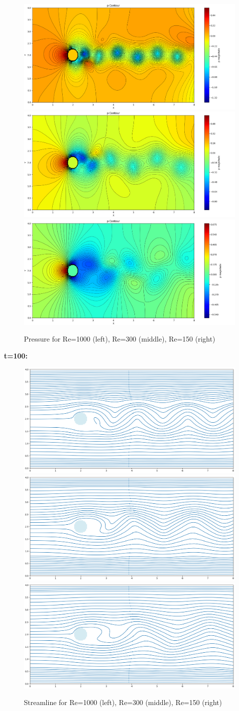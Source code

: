 \documentclass[12pt]{article}
\begin{document}
\begin{figure}[H]
    \centering
    \includegraphics[width=0.3\linewidth]{figure/N32_Re1000_8x4_t50/p_N32_Re1000_8x4_t50.jpg}
    \includegraphics[width=0.3\linewidth]{figure/N32_Re300_8x4_t50/p_N32_Re300_8x4_t50.jpg}
    \includegraphics[width=0.3\linewidth]{figure/N32_Re150_8x4_t50/p_N32_Re150_8x4_t50.jpg}
    \caption{Pressure for Re=1000 (left), Re=300 (middle), Re=150 (right)}
\end{figure}



\noindent \textbf{t=100:}
\begin{figure}[H]
    \centering
    \includegraphics[width=0.3\linewidth]{figure/N32_Re1000_8x4_t100/stline_N32_Re1000_8x4_t100.jpg}
    \includegraphics[width=0.3\linewidth]{figure/N32_Re300_8x4_t100/stline_N32_Re300_8x4_t100.jpg}
    \includegraphics[width=0.3\linewidth]{figure/N32_Re150_8x4_t100/stline_N32_Re150_8x4_t100.jpg}
    \caption{Streamline for Re=1000 (left), Re=300 (middle), Re=150 (right) }
\end{figure}
\end{document}
